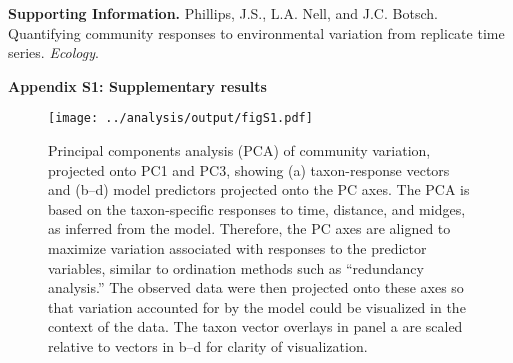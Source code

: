 \documentclass[12pt]{article}
\begin{document}
\raggedright

\textbf{Supporting Information.}
Phillips, J.S., L.A. Nell, and J.C. Botsch.
Quantifying community responses to environmental variation from replicate
time series.
\emph{Ecology}.

\vspace{12pt}

\textbf{Appendix S1: Supplementary results}

\vspace{24pt}


\begin{figure}[h!]
\centering
\texttt{[image: ../analysis/output/figS1.pdf]}
\caption{\label{fig:pca-13}
Principal components analysis (PCA) of community variation, projected onto
PC1 and PC3, showing (a) taxon-response vectors and
(b--d) model predictors projected onto the PC axes.
The PCA is based on the taxon-specific responses to time, distance, and midges,
as inferred from the model.
Therefore, the PC axes are aligned to maximize variation associated with responses
to the predictor variables, similar to ordination methods such as ``redundancy analysis.''
The observed data were then projected onto these axes so that variation accounted for
by the model could be visualized in the context of the data.
The taxon vector overlays in panel a are scaled relative to vectors in
b--d for clarity of visualization.
}
\end{figure}
\end{document}
